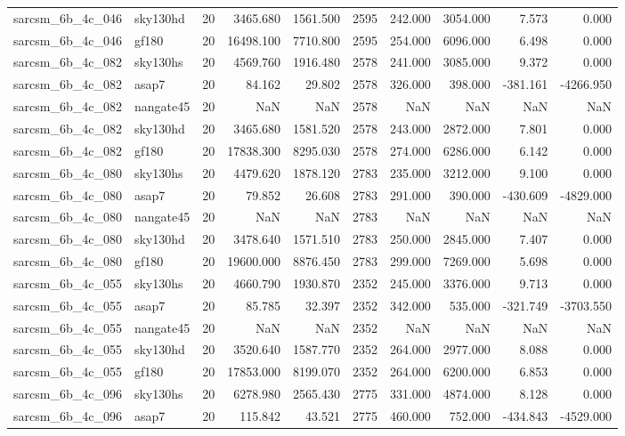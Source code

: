 \begin{longtable}{llrrrrrrrr}
sarcsm\_6b\_4c\_046 & sky130hd & 20 & 3465.680 & 1561.500 & 2595 & 242.000 & 3054.000 & 7.573 & 0.000 \\
sarcsm\_6b\_4c\_046 & gf180 & 20 & 16498.100 & 7710.800 & 2595 & 254.000 & 6096.000 & 6.498 & 0.000 \\
sarcsm\_6b\_4c\_082 & sky130hs & 20 & 4569.760 & 1916.480 & 2578 & 241.000 & 3085.000 & 9.372 & 0.000 \\
sarcsm\_6b\_4c\_082 & asap7 & 20 & 84.162 & 29.802 & 2578 & 326.000 & 398.000 & -381.161 & -4266.950 \\
sarcsm\_6b\_4c\_082 & nangate45 & 20 & NaN & NaN & 2578 & NaN & NaN & NaN & NaN \\
sarcsm\_6b\_4c\_082 & sky130hd & 20 & 3465.680 & 1581.520 & 2578 & 243.000 & 2872.000 & 7.801 & 0.000 \\
sarcsm\_6b\_4c\_082 & gf180 & 20 & 17838.300 & 8295.030 & 2578 & 274.000 & 6286.000 & 6.142 & 0.000 \\
sarcsm\_6b\_4c\_080 & sky130hs & 20 & 4479.620 & 1878.120 & 2783 & 235.000 & 3212.000 & 9.100 & 0.000 \\
sarcsm\_6b\_4c\_080 & asap7 & 20 & 79.852 & 26.608 & 2783 & 291.000 & 390.000 & -430.609 & -4829.000 \\
sarcsm\_6b\_4c\_080 & nangate45 & 20 & NaN & NaN & 2783 & NaN & NaN & NaN & NaN \\
sarcsm\_6b\_4c\_080 & sky130hd & 20 & 3478.640 & 1571.510 & 2783 & 250.000 & 2845.000 & 7.407 & 0.000 \\
sarcsm\_6b\_4c\_080 & gf180 & 20 & 19600.000 & 8876.450 & 2783 & 299.000 & 7269.000 & 5.698 & 0.000 \\
sarcsm\_6b\_4c\_055 & sky130hs & 20 & 4660.790 & 1930.870 & 2352 & 245.000 & 3376.000 & 9.713 & 0.000 \\
sarcsm\_6b\_4c\_055 & asap7 & 20 & 85.785 & 32.397 & 2352 & 342.000 & 535.000 & -321.749 & -3703.550 \\
sarcsm\_6b\_4c\_055 & nangate45 & 20 & NaN & NaN & 2352 & NaN & NaN & NaN & NaN \\
sarcsm\_6b\_4c\_055 & sky130hd & 20 & 3520.640 & 1587.770 & 2352 & 264.000 & 2977.000 & 8.088 & 0.000 \\
sarcsm\_6b\_4c\_055 & gf180 & 20 & 17853.000 & 8199.070 & 2352 & 264.000 & 6200.000 & 6.853 & 0.000 \\
sarcsm\_6b\_4c\_096 & sky130hs & 20 & 6278.980 & 2565.430 & 2775 & 331.000 & 4874.000 & 8.128 & 0.000 \\
sarcsm\_6b\_4c\_096 & asap7 & 20 & 115.842 & 43.521 & 2775 & 460.000 & 752.000 & -434.843 & -4529.000 \\

\end{longtable}
